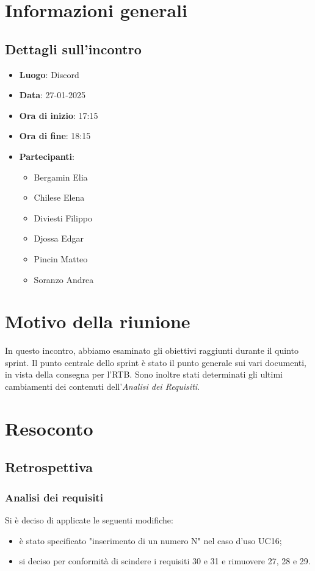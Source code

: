 \section{Informazioni generali}
\subsection{Dettagli sull'incontro}
\begin{itemize}
    \item \textbf{Luogo}: Discord
    \item \textbf{Data}: 27-01-2025
    \item \textbf{Ora di inizio}: 17:15
    \item \textbf{Ora di fine}: 18:15
    \item \textbf{Partecipanti}:
    \begin{itemize}
        \item Bergamin Elia
        \item Chilese Elena
        \item Diviesti Filippo
        \item Djossa Edgar
        \item Pincin Matteo 
        \item Soranzo Andrea  
    \end{itemize}
\end{itemize}

\section{Motivo della riunione}
In questo incontro, abbiamo esaminato gli obiettivi raggiunti durante il quinto sprint. 
Il punto centrale dello sprint è stato il punto generale sui vari documenti, in vista della consegna per l'RTB.
Sono inoltre stati determinati gli ultimi cambiamenti dei contenuti dell'\textit{Analisi dei Requisiti}.

\section{Resoconto}
\subsection{Retrospettiva}
\subsubsection{Analisi dei requisiti}
Si è deciso di applicate le seguenti modifiche:
\begin{itemize}
    \item è stato specificato "inserimento di un numero N" nel caso d'uso UC16;
    \item si  deciso per conformità di scindere i requisiti 30 e 31 e rimuovere 27, 28 e 29.
\end{itemize}

